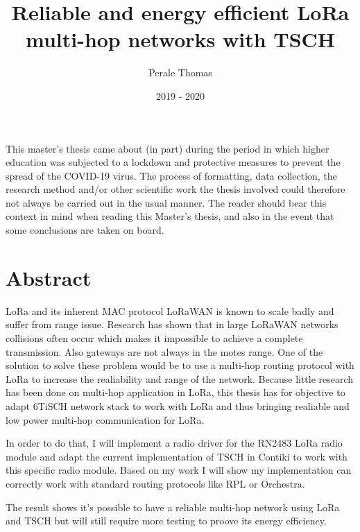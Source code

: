 \documentclass[11pt]{report}
\title{Reliable and energy efficient LoRa multi-hop networks with TSCH}
\author{Perale Thomas}
\date{2019 - 2020}
\begin{document}
\maketitle



\clearpage
\vspace*{\fill}
\begin{center}
\begin{minipage}{.6\textwidth}
This master's thesis came about (in part) during the period in which higher
education was subjected to  a  lockdown  and  protective  measures  to  prevent
the  spread  of  the  COVID-19  virus.  The  process  of formatting, data
collection, the research method and/or other scientific work the thesis
involved could therefore not always be carried out in the usual manner. The
reader should bear this context in mind when reading this Master's thesis, and
also in the event that some conclusions are taken on board.
\end{minipage}
\end{center}
\vfill %
\clearpage

\newpage

\section*{Abstract}

LoRa and its inherent MAC protocol LoRaWAN is known to scale badly and suffer
from range issue.
Research has shown that in large LoRaWAN networks collisions often occur which
makes it impossible to achieve a complete transmission.
Also gateways are not always in the motes range.
One of the solution to solve these problem would be to use a multi-hop routing
protocol with LoRa to increase the realiability and range of the network.
Because little research has been done on multi-hop application in LoRa,
this thesis has for objective to adapt 6TiSCH network stack to work with LoRa 
and thus bringing realiable and low power multi-hop communication for LoRa.

In order to do that, I will implement a radio driver for the RN2483 LoRa radio
module and adapt the current implementation of TSCH in Contiki to work with
this specific radio module.
Based on my work I will show my implementation can correctly work with standard
routing protocols like RPL or Orchestra.

The result shows it's possible to have a reliable multi-hop network using LoRa 
and TSCH but will still require more testing to proove its energy efficiency.
\end{document}
